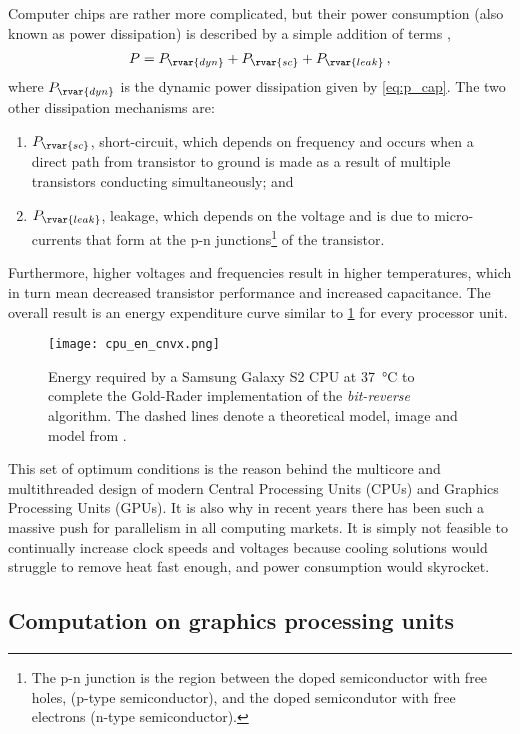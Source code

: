 Computer chips are rather more complicated, but their power consumption (also known as power dissipation) is described by a simple addition of terms \cite{cpu_pow},
\begin{align}
    P = P_{\rvar{dyn}} + P_{\rvar{sc}} + P_{\rvar{leak}}\,,
\end{align}
where $ P_{\rvar{dyn}} $ is the dynamic power dissipation given by \cref{eq:p_cap}. The two other dissipation mechanisms are:
\begin{enumerate}
    \item $P_{\rvar{sc}}$, short-circuit, which depends on frequency and occurs when a direct path from transistor to ground is made as a result of multiple transistors conducting simultaneously; and
    \item $P_{\rvar{leak}}$, leakage, which depends on the voltage and is due to micro-currents that form at the p-n junctions\footnote{The p-n junction is the region between the doped semiconductor with free holes, (p-type semiconductor), and the doped semicondutor with free electrons (n-type semiconductor).} of the transistor.
\end{enumerate}
Furthermore, higher voltages and frequencies result in higher temperatures, which in turn mean decreased transistor performance and increased capacitance. The overall result is an energy expenditure curve similar to \cref{f:cpu_en_cnvx} \cite{cpu_en_cnvx} for every processor unit.
\begin{figure}[t]
    \centering
    \texttt{[image: cpu\_en\_cnvx.png]}
    \caption[Energy expenditure of CPU vs Voltage.]{Energy required by a Samsung Galaxy S2 CPU at \SI{37}{\degreeCelsius} to complete the Gold-Rader implementation of the \emph{bit-reverse} algorithm. The dashed lines denote a theoretical model, image and model from \cite{cpu_en_cnvx}.}
    \label{f:cpu_en_cnvx}
\end{figure}

This set of optimum conditions is the reason behind the multicore and multithreaded design of modern Central Processing Units (CPUs) and Graphics Processing Units (GPUs). It is also why in recent years there has been such a massive push for parallelism in all computing markets. It is simply not feasible to continually increase clock speeds and voltages because cooling solutions would struggle to remove heat fast enough, and power consumption would skyrocket.

\subsection{Computation on graphics processing units}
\label{sc:compgpu}

